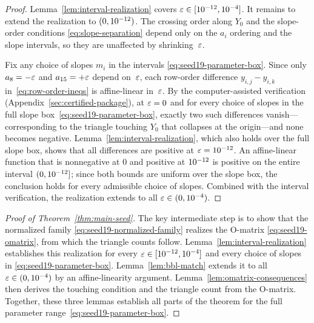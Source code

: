 \begin{proof}
Lemma~\ref{lem:interval-realization} covers
$\varepsilon\in[10^{-12},10^{-4}]$. It remains to extend
the realization to $(0,10^{-12})$. The crossing order along $Y_0$
and the slope-order conditions \eqref{eq:slope-separation} depend only on
the $a_i$ ordering and the slope intervals, so they are unaffected by
shrinking~$\varepsilon$.

Fix any choice of slopes $m_i$ in the intervals
\eqref{eq:seed19-parameter-box}. Since only $a_8=-\varepsilon$ and $a_{15}=+\varepsilon$
depend on~$\varepsilon$, each row-order difference $y_{i,j}-y_{i,k}$
in~\eqref{eq:row-order-ineqs} is affine-linear in~$\varepsilon$. By the
computer-assisted verification (Appendix~\ref{sec:certified-package}),
at $\varepsilon=0$ and for every choice of slopes in the full slope
box~\eqref{eq:seed19-parameter-box}, exactly two such differences
vanish---corresponding to the triangle touching $Y_0$ that collapses at the
origin---and none becomes negative. Lemma~\ref{lem:interval-realization},
which also holds over the full slope box, shows that all differences are
positive at $\varepsilon=10^{-12}$. An affine-linear function that is
nonnegative at $0$ and positive at $10^{-12}$ is positive on the
entire interval $(0,10^{-12}]$; since both bounds are uniform
over the slope box, the conclusion holds for every admissible choice of
slopes. Combined with the interval verification, the realization extends to
all $\varepsilon\in(0,10^{-4})$.
\end{proof}

\begin{proof}[Proof of Theorem~\ref{thm:main-seed}]
The key intermediate step is to show that the normalized family
\eqref{eq:seed19-normalized-family} realizes the
$\mathrm{O}$-matrix \eqref{eq:seed19-omatrix}, from which the triangle counts
follow.
Lemma~\ref{lem:interval-realization} establishes this realization for every
$\varepsilon\in[10^{-12},10^{-4}]$ and every choice of
slopes in \eqref{eq:seed19-parameter-box}.
Lemma~\ref{lem:bbl-match} extends it to all
$\varepsilon\in(0,10^{-4})$ by an affine-linearity argument.
Lemma~\ref{lem:omatrix-consequences} then derives the touching condition and the
triangle count from the $\mathrm{O}$-matrix. Together, these three lemmas
establish all parts of the theorem for the full parameter
range~\eqref{eq:seed19-parameter-box}.
\end{proof}
